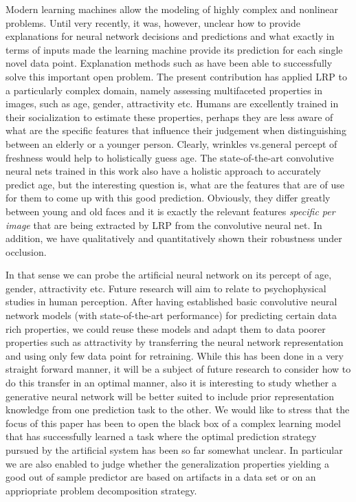 \documentclass[runningheads]{llncs}
\begin{document}
Modern learning machines allow the modeling of highly complex and nonlinear problems. Until very recently, it was, however, unclear how to provide explanations for neural network decisions and predictions and what exactly in terms of inputs made the learning machine provide its prediction for each single novel data point. Explanation methods such as \cite{baehrens,ZeilerF14,SimonyanVZ13,DBLP:conf/cidm/LandeckerTBMKB13,BacCVPR16,dosovitskiy2015inverting,zintgraf2016new,yu2014visualizing,nguyen2016multifaceted} have been able to successfully solve this important open problem. The present contribution has applied LRP to a particularly complex domain, namely assessing multifaceted properties in images, such as age, gender, attractivity etc. Humans are excellently trained in their socialization to estimate these properties, perhaps they are less aware of what are the specific features that influence their judgement when distinguishing between an elderly or a younger person. Clearly, wrinkles vs.\a general percept of freshness would help to holistically guess age. The state-of-the-art convolutive neural nets trained in this work also have a holistic approach to accurately predict age, but the interesting question is, what are the features that are of use for them to come up with this good prediction. Obviously, they differ greatly between young and old faces and it is exactly the relevant features {\em specific per image} that are being extracted by LRP from the convolutive neural net. In addition, we have qualitatively and quantitatively shown their robustness under occlusion. 

In that sense we can probe the artificial neural network on its percept of age, gender, attractivity etc. Future research will aim to relate to psychophysical studies in human perception. After having established
basic convolutive neural network models (with state-of-the-art performance) for predicting certain data rich properties, we could reuse these models and adapt them to data poorer properties such as attractivity by transferring the neural network representation and using only few data point for retraining. While this has been done in a very straight forward manner, it will be a subject of future research to consider how to do this transfer in an optimal manner, also it is interesting to study whether a generative neural network will be better suited to include prior representation knowledge from one prediction task to the other. We would like to stress that the focus of this paper has been to open the black box of a complex learning model that has successfully learned a task where the optimal prediction strategy pursued by the artificial system has been so far somewhat unclear. In particular we are also enabled to judge whether the generalization properties yielding a good out of sample predictor are based on artifacts in a data set or on an appriopriate problem decomposition strategy.     
\end{document}
